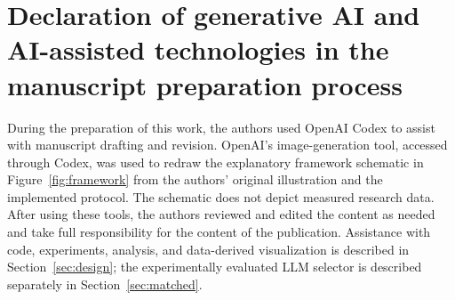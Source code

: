 \documentclass[11pt]{article}
\begin{document}
\section*{Declaration of generative AI and AI-assisted technologies in the manuscript preparation process}
During the preparation of this work, the authors used OpenAI Codex to assist with manuscript drafting and revision. OpenAI's image-generation tool, accessed through Codex, was used to redraw the explanatory framework schematic in Figure~\ref{fig:framework} from the authors' original illustration and the implemented protocol. The schematic does not depict measured research data. After using these tools, the authors reviewed and edited the content as needed and take full responsibility for the content of the publication. Assistance with code, experiments, analysis, and data-derived visualization is described in Section~\ref{sec:design}; the experimentally evaluated LLM selector is described separately in Section~\ref{sec:matched}.


\setlength{\bibsep}{4pt}

\end{document}
